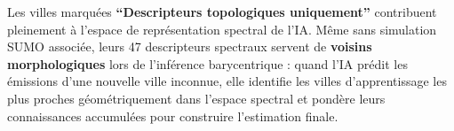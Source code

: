 \documentclass[10pt, a4paper]{article}
\begin{document}
Les villes marquées \textbf{``Descripteurs topologiques uniquement''}
contribuent pleinement à l'espace de représentation spectral de l'IA.
Même sans simulation SUMO associée, leurs 47 descripteurs spectraux
servent de \textbf{voisins morphologiques} lors de l'inférence
barycentrique : quand l'IA prédit les émissions d'une nouvelle ville
inconnue, elle identifie les villes d'apprentissage les plus proches
géométriquement dans l'espace spectral et pondère leurs connaissances
accumulées pour construire l'estimation finale.
\end{document}

